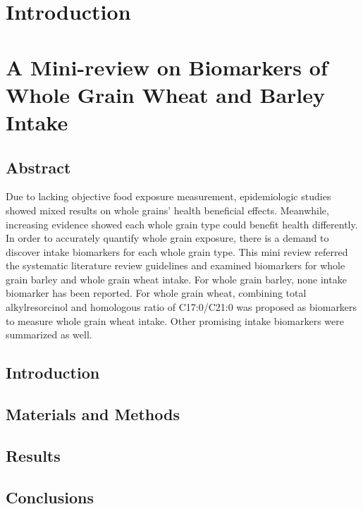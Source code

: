\documentclass[]{report}
\begin{document}
%
\chapter{Introduction}


\chapter{A Mini-review on Biomarkers of Whole Grain Wheat and Barley Intake}
	\section{Abstract}
	Due to lacking objective food exposure measurement, epidemiologic studies showed mixed results on whole grains' health beneficial effects.
	Meanwhile, increasing evidence showed each whole grain type could benefit health differently. 
	In order to accurately quantify whole grain exposure, there is a demand to discover intake biomarkers for each whole grain type.
	This mini review referred the systematic literature review guidelines and examined biomarkers for whole grain barley and whole grain wheat intake.
	For whole grain barley, none intake biomarker has been reported.
	For whole grain wheat, combining total alkylresorcinol and homologous ratio of C17:0/C21:0 was proposed as biomarkers to measure whole grain wheat intake.
	Other promising intake biomarkers were summarized as well.
	\section{Introduction}
	
	
	\section{Materials and Methods}
	
	
	\section{Results}
	
		
	\section{Conclusions}
	
	
\end{document}
